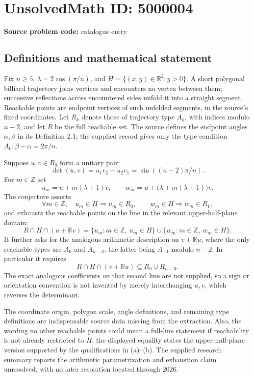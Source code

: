 \documentclass[11pt]{article}
\newcommand{\Z}{\mathbb{Z}}
\newcommand{\R}{\mathbb{R}}
\begin{document}
\section*{UnsolvedMath ID: 5000004}
\textbf{Source problem code:} catalogue entry
\subsection{Definitions and mathematical statement}
Fix \(n\ge5\), \(\lambda=2\cos(\pi/n)\), and \(H=\{(x,y)\in\R^2:y>0\}\). A short polygonal billiard trajectory joins vertices and encounters no vertex between them; successive reflections across encountered sides unfold it into a straight segment. Reachable points are endpoint vertices of such unfolded segments, in the source's fixed coordinates. Let \(R_k\) denote those of trajectory type \(A_k\), with indices modulo \(n-2\), and let \(R\) be the full reachable set. The source defines the endpoint angles \(\alpha,\beta\) in its Definition 2.1; the supplied record gives only the type condition \(A_0:\beta-\alpha=2\pi/n\).

Suppose \(u,v\in R_0\) form a unitary pair:
\[
\det(u,v)=u_1v_2-u_2v_1=\sin((n-2)\pi/n).
\]
For \(m\in\Z\) set
\[
u_m=u+m(\lambda+1)v,\qquad
w_m=u+\bigl(\lambda+m(\lambda+1)\bigr)v.
\]
The conjecture asserts
\[
\forall m\in\Z,\quad u_m\in H\Longrightarrow u_m\in R_0,
\qquad w_m\in H\Longrightarrow w_m\in R_1,
\]
and exhausts the reachable points on the line in the relevant upper-half-plane domain:
\[
R\cap H\cap(u+\R v)
=\{u_m:m\in\Z,\ u_m\in H\}\cup
\{w_m:m\in\Z,\ w_m\in H\}.
\]
It further asks for the analogous arithmetic description on \(v+\R u\), where the only reachable types are \(A_0\) and \(A_{n-3}\), the latter being \(A_{-1}\) modulo \(n-2\). In particular it requires
\[
R\cap H\cap(v+\R u)\subseteq R_0\cup R_{n-3}.
\]
The exact analogous coefficients on that second line are not supplied, so a sign or orientation convention is not invented by merely interchanging \(u,v\), which reverses the determinant.

The coordinate origin, polygon scale, angle definitions, and remaining type definitions are indispensable source data missing from the extraction. Also, the wording no other reachable points could mean a full-line statement if reachability is not already restricted to \(H\); the displayed equality states the upper-half-plane version supported by the qualifications in (a)--(b). The supplied research summary reports the arithmetic parametrization and exhaustion claim unresolved, with no later resolution located through 2026.
\end{document}

